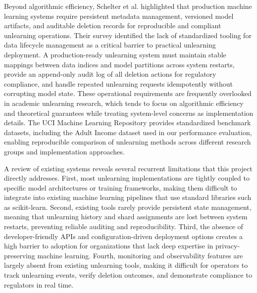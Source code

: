 Beyond algorithmic efficiency, Schelter et al. \cite{schelter2021heterogeneous} highlighted that production machine learning systems require persistent metadata management, versioned model artifacts, and auditable deletion records for reproducible and compliant unlearning operations. Their survey identified the lack of standardized tooling for data lifecycle management as a critical barrier to practical unlearning deployment. A production-ready unlearning system must maintain stable mappings between data indices and model partitions across system restarts, provide an append-only audit log of all deletion actions for regulatory compliance, and handle repeated unlearning requests idempotently without corrupting model state. These operational requirements are frequently overlooked in academic unlearning research, which tends to focus on algorithmic efficiency and theoretical guarantees while treating system-level concerns as implementation details. The UCI Machine Learning Repository \cite{dua2019uci} provides standardized benchmark datasets, including the Adult Income dataset used in our performance evaluation, enabling reproducible comparison of unlearning methods across different research groups and implementation approaches.

A review of existing systems reveals several recurrent limitations that this project directly addresses. First, most unlearning implementations are tightly coupled to specific model architectures or training frameworks, making them difficult to integrate into existing machine learning pipelines that use standard libraries such as scikit-learn. Second, existing tools rarely provide persistent state management, meaning that unlearning history and shard assignments are lost between system restarts, preventing reliable auditing and reproducibility. Third, the absence of developer-friendly APIs and configuration-driven deployment options creates a high barrier to adoption for organizations that lack deep expertise in privacy-preserving machine learning. Fourth, monitoring and observability features are largely absent from existing unlearning tools, making it difficult for operators to track unlearning events, verify deletion outcomes, and demonstrate compliance to regulators in real time.

